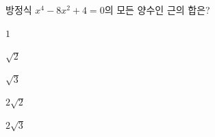 방정식 $x^4-8x^2+4=0$의 모든 양수인 근의 합은?
\begin{choices32}{\rule[-3ex]{0pt}{8ex}$1$}{\rule[-3ex]{0pt}{8ex}$\sqrt{2}$}{\rule[-3ex]{0pt}{8ex}$\sqrt{3}$}{\rule[-3ex]{0pt}{8ex}$2\sqrt{2}$}{\rule[-3ex]{0pt}{8ex}$2\sqrt{3}$}\end{choices32}
